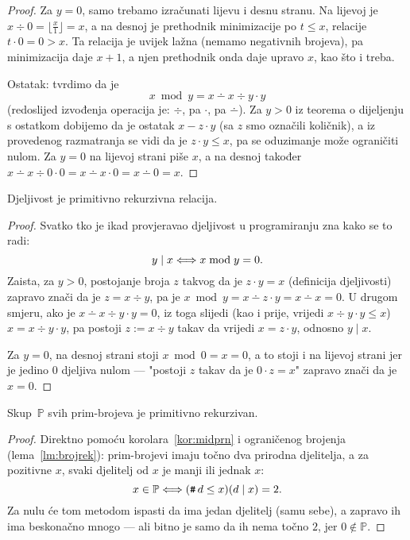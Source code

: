 \begin{proof}
Za $y=0$, samo trebamo izračunati lijevu i desnu stranu. Na lijevoj je $x\div 0=\bigl\lfloor\frac{x}{1}\bigr\rfloor=x$, a na desnoj je prethodnik minimizacije po $t\le x$, relacije $t\cdot 0=0>x$. Ta relacija je uvijek lažna (nemamo negativnih brojeva), pa minimizacija daje $x+1$, a njen prethodnik onda daje upravo $x$, kao što i treba.

Ostatak: tvrdimo da je
\begin{equation}
    x\bmod y=x\dotminus x\div y\cdot y
\end{equation}
(redoslijed izvođenja operacija je: $\div$, pa $\cdot$, pa $\dotminus$). Za $y>0$ iz teorema o dijeljenju s ostatkom dobijemo da je ostatak $x-z\cdot y$ (sa $z$ smo označili količnik), a iz provedenog razmatranja se vidi da je $z\cdot y\le x$, pa se oduzimanje može ograničiti nulom. Za $y=0$ na lijevoj strani piše $x$, a na desnoj također $x\dotminus x\div0\cdot 0=x\dotminus x\cdot0=x\dotminus0=x$.
\end{proof}

\begin{korolar}[{name=[primitivna rekurzivnost djeljivosti]}]\label{kor:midprn}
Djeljivost je primitivno rekurzivna relacija.
\end{korolar}
\begin{proof}
Svatko tko je ikad provjeravao djeljivost u programiranju zna kako se to radi:
\begin{equation}
    y\mid x\Longleftrightarrow x\bmod y=0\text.
\end{equation}
Zaista, za $y>0$, postojanje broja $z$ takvog da je $z\cdot y=x$ (definicija djeljivosti) zapravo znači da je $z=x\div y$, pa je $x\bmod y=x\dotminus z\cdot y=x\dotminus x=0$. U drugom smjeru, ako je $x\dotminus x\div y\cdot y=0$, iz toga slijedi (kao i prije, vrijedi $x\div y\cdot y\le x$) $x=x\div y\cdot y$, pa postoji $z:=x\div y$ takav da vrijedi $x=z\cdot y$, odnosno $y\mid x$.

Za $y=0$, na desnoj strani stoji $x\bmod 0=x=0$, a to stoji i na lijevoj strani jer je jedino $0$ djeljiva nulom --- "postoji $z$ takav da je $0\cdot z=x$" zapravo znači da je $x=0$.
\end{proof}

\begin{korolar}[{name=[primitivna rekurzivnost skupa svih prim-brojeva]}]
    Skup\, $\mathbb P$ svih prim-brojeva je primitivno rekurzivan.
\end{korolar}
\begin{proof}
Direktno pomoću korolara~\ref{kor:midprn} i ograničenog brojenja (lema~\ref{lm:brojrek}): prim-brojevi imaju točno dva prirodna djelitelja, a za pozitivne $x$, svaki djelitelj od $x$ je manji ili jednak $x$:
\begin{equation}\label{eq:Pprn}
    x\in\mathbb P\Longleftrightarrow(\texttt{\textup{\#}}\, d\le x)(d\mid x)=2\text.
\end{equation}
Za nulu će tom metodom ispasti da ima jedan djelitelj (samu sebe), a zapravo ih ima beskonačno mnogo --- ali bitno je samo da ih nema točno $2$, jer $0\notin\mathbb P$.
\end{proof}

